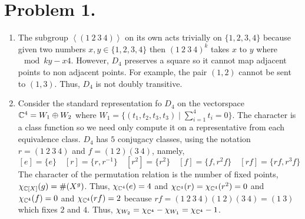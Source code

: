 \documentclass[12pt]{extarticle}
\begin{document}

\section*{Problem 1.}

\begin{enumerate}
\item The subgroup $\left< (1 \: 2 \: 3 \: 4) \right>$ on its own acts trivially on $\{1,2,3,4\}$ because given two numbers $x, y \in \{1, 2, 3, 4\}$ then $(1 \: 2 \: 3 \: 4)^k$ takes $x$ to $y$ where $\mod{k}{y - x}{4}$. However, $D_4$ preserves a square so it cannot map adjacent points to non adjacent points. For example, the pair $(1, 2)$ cannot be sent to $(1, 3)$. Thus, $D_4$ is not doubly transitive. 

\item Consider the standard representation fo $D_4$ on the vectorspace $\mathbb{C}^4 = W_1 \oplus W_2$ where $W_1 = \{(t_1, t_2, t_3, t_3) \mid \sum_{i = 1}^4 t_i = 0 \}$. The character is a class function so we need only compute it on a representative from each equivalence class. $D_4$ has $5$ conjugacy classes, using the notation $r = (1 \: 2 \: 3 \: 4)$ and $f = (1 \: 2) (3 \: 4)$, namely,
\[[e] = \{e\} \quad [r] = \{r, r^{-1}\} \quad [r^2] = \{r^2\} \quad [f] = \{f, r^2 f\} \quad [rf] = \{rf, r^3 f\} \]
The character of the permutation relation is the number of fixed points,  $\chi_{\mathbb{C}[X]}(g) = \# (X^g)$. Thus, $\chi_{\mathbb{C}^4}(e) = 4$ and $\chi_{\mathbb{C}^4}(r) = \chi_{\mathbb{C}^4}(r^2) = 0$ and $\chi_{\mathbb{C}^4}(f) = 0$ and $\chi_{\mathbb{C}^4}(rf) = 2$ because $rf = (1 \: 2 \: 3 \: 4)(1 \: 2)(3 \: 4) = (1 \: 3)$ which fixes $2$ and $4$. Thus, $\chi_{W_2} = \chi_{\mathbb{C}^4} - \chi_{W_1} = \chi_{\mathbb{C}^4} - 1$.    


\end{enumerate}
\end{document}
